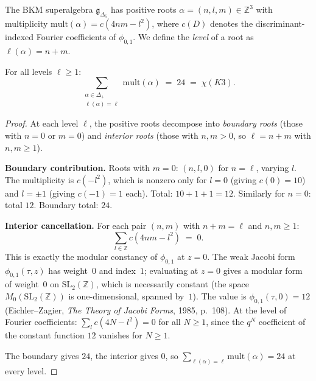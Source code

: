 \documentclass[11pt]{article}
\newcommand{\fg}{\mathfrak{g}}
\newcommand{\Z}{\mathbb{Z}}
\newcommand{\mult}{\mathrm{mult}}
\begin{document}
The BKM superalgebra $\fg_{\Delta_5}$ has positive roots $\alpha = (n, l, m) \in \Z^3$ with multiplicity $\mult(\alpha) = c(4nm - l^2)$, where $c(D)$ denotes the discriminant-indexed Fourier coefficients of $\phi_{0,1}$. We define the \emph{level} of a root as $\ell(\alpha) = n + m$.

\begin{theorem}
\label{thm:root-mult-constancy}
For all levels $\ell \geq 1$:
\[
 \sum_{\substack{\alpha \in \Delta_+ \\ \ell(\alpha) = \ell}} \mult(\alpha) \;=\; 24 \;=\; \chi(K3).
\]
\end{theorem}

\begin{proof}
At each level $\ell$, the positive roots decompose into \emph{boundary roots} (those with $n = 0$ or $m = 0$) and \emph{interior roots} (those with $n, m > 0$, so $\ell = n + m$ with $n, m \geq 1$).

\medskip\noindent\textbf{Boundary contribution.} Roots with $m = 0$: $(n, l, 0)$ for $n = \ell$, varying $l$. The multiplicity is $c(-l^2)$, which is nonzero only for $l = 0$ (giving $c(0) = 10$) and $l = \pm 1$ (giving $c(-1) = 1$ each). Total: $10 + 1 + 1 = 12$. Similarly for $n = 0$: total $12$. Boundary total: $24$.

\medskip\noindent\textbf{Interior cancellation.} For each pair $(n, m)$ with $n + m = \ell$ and $n, m \geq 1$:
\[
 \sum_{l \in \Z} c(4nm - l^2) \;=\; 0.
\]
This is exactly the modular constancy of $\phi_{0,1}$ at $z = 0$. The weak Jacobi form $\phi_{0,1}(\tau, z)$ has weight~$0$ and index~$1$; evaluating at $z = 0$ gives a modular form of weight~$0$ on $\mathrm{SL}_2(\Z)$, which is necessarily constant (the space $M_0(\mathrm{SL}_2(\Z))$ is one-dimensional, spanned by~$1$). The value is $\phi_{0,1}(\tau, 0) = 12$ (Eichler--Zagier, \emph{The Theory of Jacobi Forms}, 1985, p.~108). At the level of Fourier coefficients: $\sum_l c(4N - l^2) = 0$ for all $N \geq 1$, since the $q^N$ coefficient of the constant function $12$ vanishes for $N \geq 1$.

\medskip\noindent The boundary gives $24$, the interior gives $0$, so $\sum_{\ell(\alpha) = \ell} \mult(\alpha) = 24$ at every level.
\end{proof}
\end{document}
